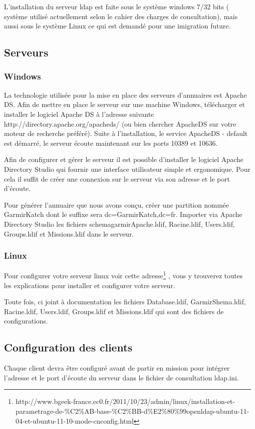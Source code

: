 
L'installation du serveur ldap est faite sous le système windows 7/32 bits ( système utilisé actuellement selon le cahier des charges de consultation), mais aussi sous le système Linux ce qui est demandé pour une imigration future. 

\subsection{Serveurs}
\subsubsection{Windows}
La technologie utilisée pour la mise en place des serveurs d’annuaires est Apache DS. Afin de mettre en place le serveur sur une machine Windows, télécharger et installer le logiciel Apache DS à l’adresse suivante http://directory.apache.org/apacheds/ (ou bien chercher ApacheDS sur votre moteur de recherche préféré). Suite à l’installation, le service ApacheDS - default est démarré, le serveur écoute maintenant sur les ports 10389 et 10636.

Afin de configurer et gérer le serveur il est possible d’installer le logiciel Apache Directory Studio qui fournir une interface utilisateur simple et ergonomique. Pour cela il suffit de créer une connexion sur le serveur via son adresse et le port d’écoute.

Pour générer l’annuaire que nous avons conçu, créer une partition nommée GarmirKatch dont le suffixe sera dc=GarmirKatch,dc=fr. Importer via Apache Directory Studio les fichiers schemagarmirApache.ldif, Racine.ldif, Users.ldif, Groups.ldif et Missions.ldif dans le serveur.
\subsubsection{Linux}
Pour configurer votre serveur linux voir cette adresse\footnote{http://www.bgeek-france.ec0.fr/2011/10/23/admin/linux/installation-et-parametrage-de-\%C2\%AB-base-\%C2\%BB-d\%E2\%80\%99openldap-ubuntu-11-04-et-ubuntu-11-10-mode-cnconfig.html }
, vous y trouverez toutes les explications pour installer et configurer votre serveur.

Toute fois, ci joint à documentation les fichiers Database.ldif, GarmirShema.ldif, Racine.ldif, Users.ldif, Groups.ldif et Missions.ldif qui sont des fichiers de configurations.
\subsection{Configuration des clients}
Chaque client devra être configuré avant de partir en mission pour intégrer l’adresse et le port d’écoute du serveur dans le fichier de consultation ldap.ini.